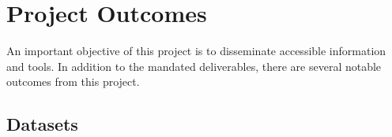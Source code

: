 \section{Project Outcomes}

An important objective of this project is to disseminate accessible information and tools. In addition to the mandated deliverables, there are several notable outcomes from this project. 















\subsection{Datasets}
\printbibliography[heading=none, keyword={my_dataset}]

